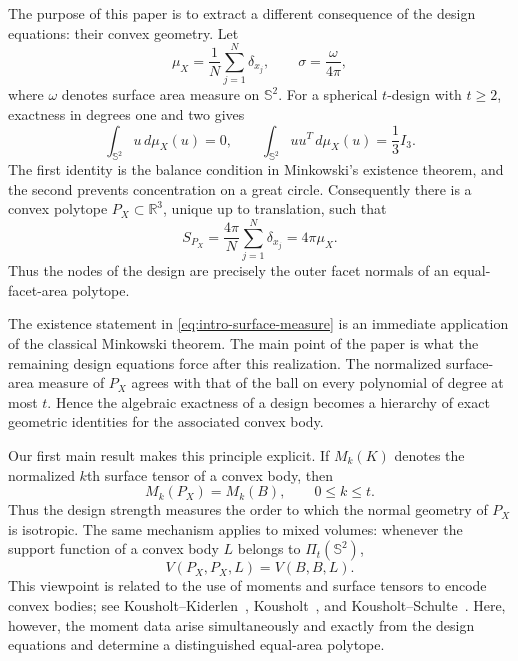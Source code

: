 \documentclass[11pt]{article}
\theoremstyle{definition}
\theoremstyle{remark}
\newcommand{\Sph}{\mathbb S}
\newcommand{\R}{\mathbb R}
\begin{document}
The purpose of this paper is to extract a different consequence of the design equations: their convex geometry. Let
\[
\mu_X=\frac1N\sum_{j=1}^N\delta_{x_j},
\qquad
\sigma=\frac{\omega}{4\pi},
\]
where $\omega$ denotes surface area measure on $\Sph^2$. For a spherical $t$-design with $t\ge2$, exactness in degrees one and two gives
\begin{equation}\label{eq:intro-moments}
\int_{\Sph^2}u\,d\mu_X(u)=0,
\qquad
\int_{\Sph^2}uu^T\,d\mu_X(u)=\frac13 I_3.
\end{equation}
The first identity is the balance condition in Minkowski's existence theorem, and the second prevents concentration on a great circle. Consequently there is a convex polytope $P_X\subset\R^3$, unique up to translation, such that
\begin{equation}\label{eq:intro-surface-measure}
S_{P_X}=\frac{4\pi}{N}\sum_{j=1}^N\delta_{x_j}=4\pi\mu_X.
\end{equation}
Thus the nodes of the design are precisely the outer facet normals of an equal-facet-area polytope.

The existence statement in \eqref{eq:intro-surface-measure} is an immediate application of the classical Minkowski theorem. The main point of the paper is what the remaining design equations force after this realization. The normalized surface-area measure of $P_X$ agrees with that of the ball on every polynomial of degree at most $t$. Hence the algebraic exactness of a design becomes a hierarchy of exact geometric identities for the associated convex body.

Our first main result makes this principle explicit. If $M_k(K)$ denotes the normalized $k$th surface tensor of a convex body, then
\begin{equation}\label{eq:intro-isotropy}
M_k(P_X)=M_k(B),\qquad 0\le k\le t.
\end{equation}
Thus the design strength measures the order to which the normal geometry of $P_X$ is isotropic. The same mechanism applies to mixed volumes: whenever the support function of a convex body $L$ belongs to $\Pi_t(\Sph^2)$,
\[
V(P_X,P_X,L)=V(B,B,L).
\]
This viewpoint is related to the use of moments and surface tensors to encode convex bodies; see Kousholt--Kiderlen~\cite{KousholtKiderlen2016}, Kousholt~\cite{Kousholt2017}, and Kousholt--Schulte~\cite{KousholtSchulte2021}. Here, however, the moment data arise simultaneously and exactly from the design equations and determine a distinguished equal-area polytope.
\end{document}
